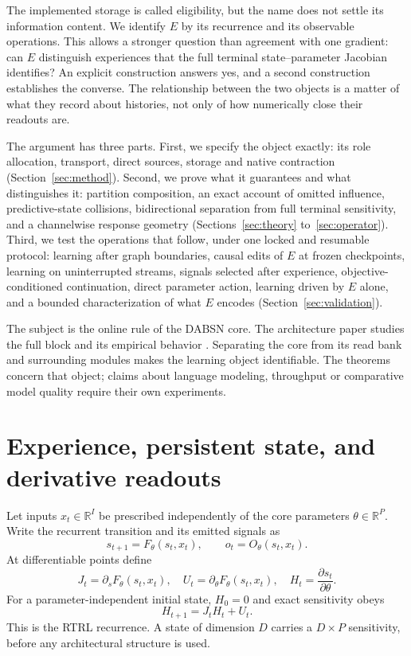 \documentclass[11pt]{article}
\theoremstyle{definition}
\newcommand{\R}{\mathbb R}
\begin{document}
The implemented storage is called eligibility, but the name does not settle its
information content. We identify $E$ by its recurrence and its observable
operations. This allows a stronger question than agreement with one gradient: can
$E$ distinguish experiences that the full terminal state--parameter Jacobian
identifies? An explicit construction answers yes, and a second construction
establishes the converse. The relationship between the two objects is a matter of
what they record about histories, not only of how numerically close their readouts
are.

The argument has three parts. First, we specify the object exactly: its role
allocation, transport, direct sources, storage and native contraction
(Section~\ref{sec:method}). Second, we prove what it guarantees and what
distinguishes it: partition composition, an exact account of omitted influence,
predictive-state collisions, bidirectional separation from full terminal
sensitivity, and a channelwise response geometry (Sections~\ref{sec:theory}
to~\ref{sec:operator}). Third, we test the operations that follow, under one locked
and resumable protocol: learning after graph boundaries, causal edits of $E$ at
frozen checkpoints, learning on uninterrupted streams, signals selected after
experience, objective-conditioned continuation, direct parameter action, learning
driven by $E$ alone, and a bounded characterization of what $E$ encodes
(Section~\ref{sec:validation}).

The subject is the online rule of the DABSN core. The architecture paper studies
the full block and its empirical behavior \citep{rosdahl2026dabsn}. Separating the
core from its read bank and surrounding modules makes the learning object
identifiable. The theorems concern that object; claims about language modeling,
throughput or comparative model quality require their own experiments.

\section{Experience, persistent state, and derivative readouts}
\label{sec:objects}

Let inputs $x_t\in\R^I$ be prescribed independently of the core parameters
$\theta\in\R^P$. Write the recurrent transition and its emitted signals as
\begin{equation}
 s_{t+1}=F_\theta(s_t,x_t),\qquad o_t=O_\theta(s_t,x_t).
 \label{eq:system}
\end{equation}
At differentiable points define
\begin{equation}
 J_t=\partial_sF_\theta(s_t,x_t),\quad
 U_t=\partial_\theta F_\theta(s_t,x_t),\quad
 H_t=\frac{\partial s_t}{\partial\theta}.
 \label{eq:derivatives}
\end{equation}
For a parameter-independent initial state, $H_0=0$ and exact sensitivity obeys
\begin{equation}
 H_{t+1}=J_tH_t+U_t.
 \label{eq:rtrl}
\end{equation}
This is the RTRL recurrence. A state of dimension $D$ carries a $D\times P$
sensitivity, before any architectural structure is used.
\end{document}
